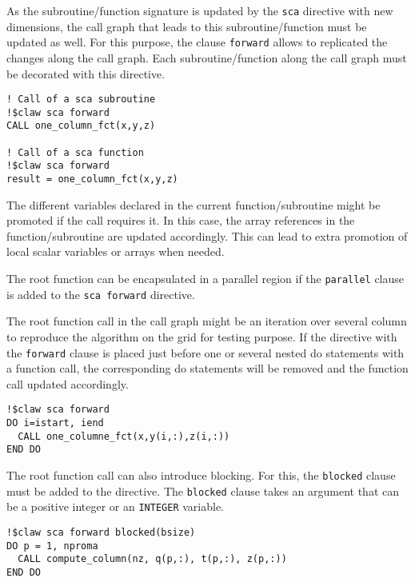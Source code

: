 As the subroutine/function signature is updated by the \lstinline!sca!
directive with new dimensions, the call graph that leads to this
subroutine/function must be updated as well. For this purpose, the clause
\lstinline!forward! allows to replicated the changes along the call graph.
Each subroutine/function along the call graph must be decorated with this
directive.

\begin{lstlisting}
! Call of a sca subroutine
!$claw sca forward
CALL one_column_fct(x,y,z)

! Call of a sca function
!$claw sca forward
result = one_column_fct(x,y,z)
\end{lstlisting}

The different variables declared in the current function/subroutine might be
promoted if the call requires it. In this case, the array references in
the function/subroutine are updated accordingly. This can lead to extra
promotion of local scalar variables or arrays when needed.

The root function can be encapsulated in a parallel region if the 
\lstinline|parallel| clause is added to the \lstinline|sca forward| directive.

The root function call in the call graph might be an iteration over several
column to reproduce the algorithm on the grid for testing purpose. If the
directive with the \lstinline!forward! clause is placed just before one or
several nested do statements with a function call, the corresponding do
statements will be removed and the function call updated accordingly.

\begin{lstlisting}
!$claw sca forward
DO i=istart, iend
  CALL one_columne_fct(x,y(i,:),z(i,:))
END DO
\end{lstlisting}

The root function call can also introduce blocking. For this, 
the \lstinline|blocked| clause must be added to the directive. 
The \lstinline|blocked| clause takes an argument that can be a positive integer
or an \lstinline|INTEGER| variable.


\begin{lstlisting}
!$claw sca forward blocked(bsize)
DO p = 1, nproma     
  CALL compute_column(nz, q(p,:), t(p,:), z(p,:))                                                                                             
END DO 
\end{lstlisting}

